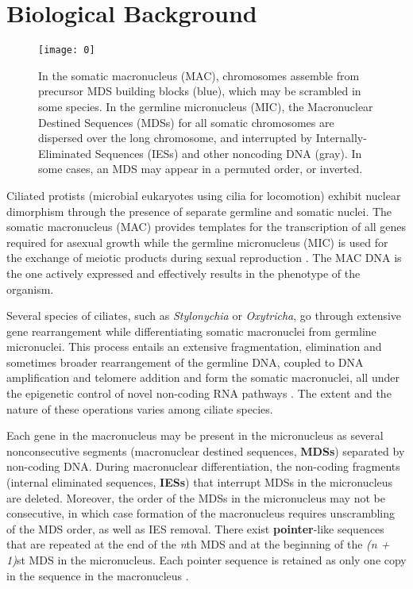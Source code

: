 \section{Biological Background}

\begin{figure}[h]
  \centering
	\texttt{[image: 0]}
  \caption{In the somatic macronucleus (MAC), chromosomes assemble from precursor MDS building blocks (blue), which may be scrambled in some species. In the germline micronucleus (MIC), the Macronuclear Destined Sequences (MDSs) for all somatic chromosomes are dispersed over the long chromosome, and interrupted by Internally-Eliminated Sequences (IESs) and other noncoding DNA (gray). In some cases, an MDS may appear in a permuted order, or inverted\cite{mdsiesdb}.
}
\end{figure}

Ciliated protists (microbial eukaryotes using cilia for locomotion) exhibit nuclear dimorphism through the presence of separate germline and somatic nuclei. The somatic macronucleus (MAC) provides templates for the transcription of all genes required for asexual growth while the germline micronucleus (MIC) is used for the exchange of meiotic products during sexual reproduction \cite{mdsiesdb}. The MAC DNA is the one actively expressed and effectively results in the phenotype of the organism.

Several species of ciliates, such as \textit{Stylonychia} or \textit{Oxytricha}, go through extensive gene rearrangement while differentiating somatic macronuclei from germline micronuclei. This process entails an extensive fragmentation, elimination and sometimes broader rearrangement of the germline DNA, coupled to DNA amplification and telomere addition \cite{ciliatedDNA} and form the somatic macronuclei, all under the epigenetic control of novel non-coding RNA pathways \cite{programmedgenome}. The extent and the nature of these operations varies among ciliate species.

Each gene in the macronucleus may be present in the micronucleus as several nonconsecutive segments (macronuclear destined sequences, \textbf{MDSs}) separated by non-coding DNA. During macronuclear differentiation, the non-coding fragments (internal eliminated sequences, \textbf{IESs}) that interrupt MDSs in the micronucleus are deleted. Moreover, the order of the MDSs in the micronucleus may not be consecutive, in which case formation of the macronucleus requires unscrambling of the MDS order, as well as IES removal. There exist \textbf{pointer}-like sequences that are repeated at the end of the \textit{n}th MDS and at the beginning of the \textit{(n + 1)}st MDS in the micronucleus. Each pointer sequence is retained as only one copy in the sequence in the macronucleus \cite{ANGELESKA2007706}.

